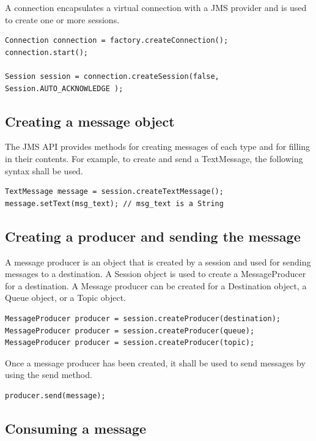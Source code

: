 \documentclass[9pt,twocolumn,twoside]{../../styles/osajnl}
\begin{document}
A connection encapsulates a virtual connection with a JMS provider
and is used to create one or more sessions.

\begin{lstlisting}
Connection connection = factory.createConnection();
connection.start();

Session session = connection.createSession(false,
Session.AUTO_ACKNOWLEDGE );
\end{lstlisting}

\subsection{Creating a message object}

The JMS API provides methods for creating messages of each type and
for filling in their contents. For example, to create and send a
TextMessage, the following syntax shall be used.

\begin{lstlisting}
TextMessage message = session.createTextMessage();
message.setText(msg_text); // msg_text is a String
\end{lstlisting}

\subsection{Creating a producer and sending the message}

A message producer is an object that is created by a session and used
for sending messages to a destination.  A Session object is used to
create a MessageProducer for a destination. A Message producer can be
created for a Destination object, a Queue object, or a Topic object.

\begin{lstlisting}
MessageProducer producer = session.createProducer(destination);
MessageProducer producer = session.createProducer(queue);
MessageProducer producer = session.createProducer(topic);
\end{lstlisting}

Once a message producer has been created, it shall be used to send
messages by using the send method.

\begin{lstlisting}
producer.send(message);
\end{lstlisting}

\subsection{Consuming a message}
\end{document}
